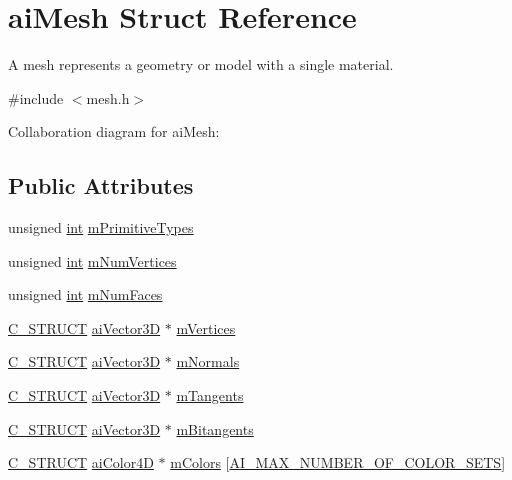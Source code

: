 \hypertarget{structai_mesh}{\section{ai\-Mesh Struct Reference}
\label{structai_mesh}
}


A mesh represents a geometry or model with a single material.  




{\ttfamily \#include $<$mesh.\-h$>$}



Collaboration diagram for ai\-Mesh\-:
\subsection*{Public Attributes}
\begin{DoxyCompactItemize}
\item 
unsigned \hyperlink{_s_d_l__thread_8h_a6a64f9be4433e4de6e2f2f548cf3c08e}{int} \hyperlink{structai_mesh_a99d66ac0a444068c1b252b30265cbf53}{m\-Primitive\-Types}
\item 
unsigned \hyperlink{_s_d_l__thread_8h_a6a64f9be4433e4de6e2f2f548cf3c08e}{int} \hyperlink{structai_mesh_ab34b7b5941e6636f1c08f615cbb072ef}{m\-Num\-Vertices}
\item 
unsigned \hyperlink{_s_d_l__thread_8h_a6a64f9be4433e4de6e2f2f548cf3c08e}{int} \hyperlink{structai_mesh_aeed22ee6963b79548f3877b3c905518e}{m\-Num\-Faces}
\item 
\hyperlink{defs_8h_ab51df4230ceb602bbc1bc109c432a6a0}{C\-\_\-\-S\-T\-R\-U\-C\-T} \hyperlink{structai_vector3_d}{ai\-Vector3\-D} $\ast$ \hyperlink{structai_mesh_afd4588abb3e1c72821ae0234a3850662}{m\-Vertices}
\item 
\hyperlink{defs_8h_ab51df4230ceb602bbc1bc109c432a6a0}{C\-\_\-\-S\-T\-R\-U\-C\-T} \hyperlink{structai_vector3_d}{ai\-Vector3\-D} $\ast$ \hyperlink{structai_mesh_aec81b496b4d93838cef038933dabe9b9}{m\-Normals}
\item 
\hyperlink{defs_8h_ab51df4230ceb602bbc1bc109c432a6a0}{C\-\_\-\-S\-T\-R\-U\-C\-T} \hyperlink{structai_vector3_d}{ai\-Vector3\-D} $\ast$ \hyperlink{structai_mesh_af367ff78bd69f3e83d7edc8ad67dc5df}{m\-Tangents}
\item 
\hyperlink{defs_8h_ab51df4230ceb602bbc1bc109c432a6a0}{C\-\_\-\-S\-T\-R\-U\-C\-T} \hyperlink{structai_vector3_d}{ai\-Vector3\-D} $\ast$ \hyperlink{structai_mesh_ab2a81bfe1731f01271ebab274a8f01c4}{m\-Bitangents}
\item 
\hyperlink{defs_8h_ab51df4230ceb602bbc1bc109c432a6a0}{C\-\_\-\-S\-T\-R\-U\-C\-T} \hyperlink{structai_color4_d}{ai\-Color4\-D} $\ast$ \hyperlink{structai_mesh_ad9215f67bd0c2277b10775a8adb66b96}{m\-Colors} \mbox{[}\hyperlink{mesh_8h_a74ea1282873ac4b111b48d2380c26bdc}{A\-I\-\_\-\-M\-A\-X\-\_\-\-N\-U\-M\-B\-E\-R\-\_\-\-O\-F\-\_\-\-C\-O\-L\-O\-R\-\_\-\-S\-E\-T\-S}\mbox{]}

\end{DoxyCompactItemize}
